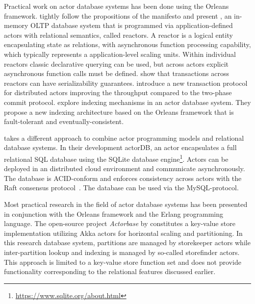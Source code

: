   Practical work on actor database systems has been done using the Orleans framework.
   tightly follow the propositions of the manifesto and present \reactdb{},
  an in-memory OLTP database system that is programmed via application-defined actors with relational semantics, called reactors.
  A reactor is a logical entity encapsulating state as relations, with
  asynchronous function processing capability, which typically represents a application-level scaling units.
  Within individual reactors classic declarative querying can be used, but across actors explicit asynchronous function calls must be defined.
  \citeauthor{Shah:reactdb} show that transactions across reactors can have serializability guarantees.
   introduce a new transaction protocol for distributed actors improving the throughput compared to the two-phase commit protocol.
   explore indexing mechanisms in an actor database system.
  They propose a new indexing architecture based on the Orleans framework that is fault-tolerant and eventually-consistent.

   takes a different approach to combine actor programming models and relational database systems.
  In their development actorDB, an actor encapsulates a full relational SQL database using the SQLite database engine\footnote{\url{https://www.sqlite.org/about.html}}.
  Actors can be deployed in an distributed cloud environment and communicate asynchronously.
  The database is ACID-conform and enforces consistency across actors with the Raft consensus protocol~\cite{raft}.
  The database can be used via the MySQL-protocol.

  Most practical research in the field of actor database systems has been presented in conjunction with the Orleans framework and the Erlang programming language.
  The open-source project \textit{Actorbase} by \citet{actorbase} constitutes a key-value store implementation utilizing Akka actors for horizontal scaling and partitioning.
  In this research database system, partitions are managed by storekeeper actors while inter-partition lookup and indexing is managed by so-called storefinder actors.
  This approach is limited to a key-value store function set and does not provide functionality corresponding to the relational features discussed earlier.
